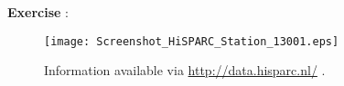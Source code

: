 \begin{shaded}
\textbf{Exercise \theExercise {}} : \end{shaded}

\footnotemark
\footnotetext{}

\begin{figure}\begin{center}
\texttt{[image: Screenshot\_HiSPARC\_Station\_13001.eps]}
\caption{Information available via \protect\url{http://data.hisparc.nl/} .}\label{fig:data_screen}
\end{center}\end{figure}
